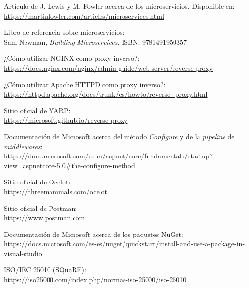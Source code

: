 \documentclass[11pt,spanish,listoffigures]{tfgetsinf}
\begin{document}
\begin{thebibliography}{10}

Artículo de J. Lewis y M. Fowler acerca de los microservicios.
\newblock Disponible en:\\
\url{https://martinfowler.com/articles/microservices.html}

Libro de referencia sobre microservicios:\\
\newblock Sam Newman,
\newblock \emph{Building Microservices.}
\newblock ISBN: 9781491950357

¿Cómo utilizar NGINX como proxy inverso?:\\
\url{https://docs.nginx.com/nginx/admin-guide/web-server/reverse-proxy}

¿Cómo utilizar Apache HTTPD como proxy inverso?:\\
\url{https://httpd.apache.org/docs/trunk/es/howto/reverse_proxy.html}

Sitio oficial de YARP:\\
\url{https://microsoft.github.io/reverse-proxy}

Documentación de Microsoft acerca del método \emph{Configure} y de la \emph{pipeline} de \emph{middlewares}:\\
\url{https://docs.microsoft.com/es-es/aspnet/core/fundamentals/startup?view=aspnetcore-5.0#the-configure-method}

Sitio oficial de Ocelot:\\
\url{https://threemammals.com/ocelot}

Sitio oficial de Postman:\\
\url{https://www.postman.com}

Documentación de Microsoft acerca de los paquetes NuGet:\\
\url{https://docs.microsoft.com/es-es/nuget/quickstart/install-and-use-a-package-in-visual-studio}

ISO/IEC 25010 (SQuaRE):\\
\url{https://iso25000.com/index.php/normas-iso-25000/iso-25010}

\end{thebibliography}
\end{document}
